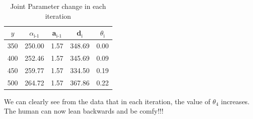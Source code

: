 \documentclass[12pt, letterpaper]{amsart} %
\numberwithin{equation}{section}
\begin{document}
\begin{table}[H]
  \centering
  \begin{tabular}{c|cccc}
$y$ & $\alpha$$_{\text{i-1}}$ & a$_{\text{i-1}}$ & d$_{\text{i}}$ & $\theta$$_{\text{i}}$\\
\hline
350 & 250.00 & 1.57 & 348.69 & 0.00\\
400 & 252.46 & 1.57 & 345.69 & 0.09\\
450 & 259.77 & 1.57 & 334.50 & 0.19\\
500 & 264.72 & 1.57 & 367.86 & 0.22\\
\end{tabular}
  \caption{Joint Parameter change in each iteration}
\end{table}
We can clearly see from the data that in each iteration, the value of $\theta_4$ increases. The human can now lean backwards and be comfy!!! \par
\end{document}
